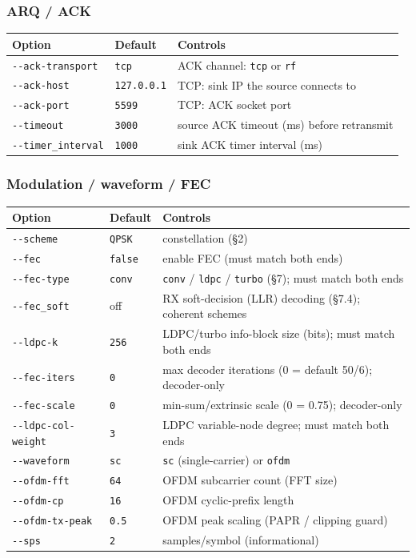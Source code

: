 \documentclass[
  10pt,
]{article}
\begin{document}
\hypertarget{arq--ack}{%
\subsubsection{ARQ / ACK}\label{arq--ack}}

\begin{longtable}[]{@{}lll@{}}
\toprule
Option & Default & Controls \\
\midrule
\endhead
\texttt{-\/-ack-transport} & \texttt{tcp} & ACK channel: \texttt{tcp} or
\texttt{rf} \\
\texttt{-\/-ack-host} & \texttt{127.0.0.1} & TCP: sink IP the source
connects to \\
\texttt{-\/-ack-port} & \texttt{5599} & TCP: ACK socket port \\
\texttt{-\/-timeout} & \texttt{3000} & source ACK timeout (ms) before
retransmit \\
\texttt{-\/-timer\_interval} & \texttt{1000} & sink ACK timer interval
(ms) \\
\bottomrule
\end{longtable}

\hypertarget{modulation--waveform--fec}{%
\subsubsection{Modulation / waveform /
FEC}\label{modulation--waveform--fec}}

\begin{longtable}[]{@{}lll@{}}
\toprule
Option & Default & Controls \\
\midrule
\endhead
\texttt{-\/-scheme} & \texttt{QPSK} & constellation (§2) \\
\texttt{-\/-fec} & \texttt{false} & enable FEC (must match both ends) \\
\texttt{-\/-fec-type} & \texttt{conv} & \texttt{conv} / \texttt{ldpc} /
\texttt{turbo} (§7); must match both ends \\
\texttt{-\/-fec\_soft} & off & RX soft-decision (LLR) decoding (§7.4);
coherent schemes \\
\texttt{-\/-ldpc-k} & \texttt{256} & LDPC/turbo info-block size (bits);
must match both ends \\
\texttt{-\/-fec-iters} & \texttt{0} & max decoder iterations (0 =
default 50/6); decoder-only \\
\texttt{-\/-fec-scale} & \texttt{0} & min-sum/extrinsic scale (0 =
0.75); decoder-only \\
\texttt{-\/-ldpc-col-weight} & \texttt{3} & LDPC variable-node degree;
must match both ends \\
\texttt{-\/-waveform} & \texttt{sc} & \texttt{sc} (single-carrier) or
\texttt{ofdm} \\
\texttt{-\/-ofdm-fft} & \texttt{64} & OFDM subcarrier count (FFT
size) \\
\texttt{-\/-ofdm-cp} & \texttt{16} & OFDM cyclic-prefix length \\
\texttt{-\/-ofdm-tx-peak} & \texttt{0.5} & OFDM peak scaling (PAPR /
clipping guard) \\
\texttt{-\/-sps} & \texttt{2} & samples/symbol (informational) \\
\bottomrule
\end{longtable}
\end{document}
